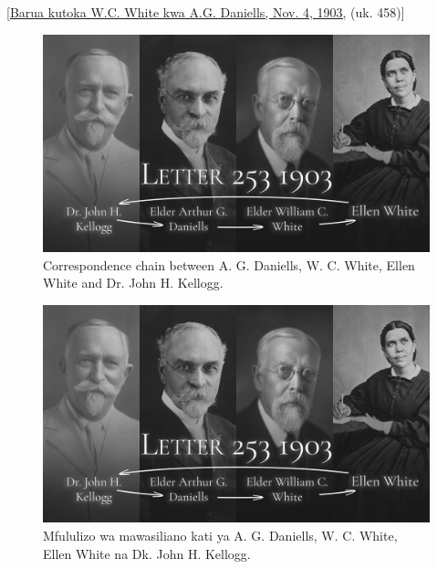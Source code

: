 [\href{https://ellenwhite.org/letterbooks/555}{Barua kutoka W.C. White kwa A.G. Daniells, Nov. 4, 1903,} (uk. 458)]


\begin{figure}[h]
    \centering
    \includegraphics[width=1\linewidth]{images/correspondance.jpg}
    \caption*{Correspondence chain between A. G. Daniells, W. C. White, Ellen White and Dr. John H. Kellogg.}
    \label{fig:corespondance}
\end{figure}


\begin{figure}[h]
    \centering
    \includegraphics[width=1\linewidth]{images/correspondance.jpg}
    \caption*{Mfululizo wa mawasiliano kati ya A. G. Daniells, W. C. White, Ellen White na Dk. John H. Kellogg.}
    \label{fig:corespondance}
\end{figure}



